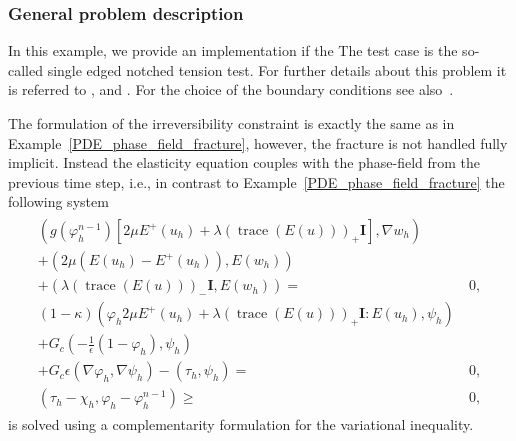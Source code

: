 \subsubsection{General problem description}
In this example, we provide an implementation if the
The test case is the so-called single edged notched 
tension test. For further details about this problem it is referred
to \cite{MieHofWel2010,BoVeScoHuLa12}, and \cite{WeWiWo2014}.
For the choice of the boundary conditions see also~\cite[Section~5]{MangWallothWickWollner:2019}.

The formulation of the irreversibility constraint  is exactly the same
as in Example~\ref{PDE_phase_field_fracture}, however, the fracture is
not handled fully implicit. Instead the elasticity equation
couples with the phase-field from the previous time step, i.e., in
contrast to Example~\ref{PDE_phase_field_fracture} the following
system 
\begin{align*}
 \begin{aligned}
   \left(g(\varphi_h^{n-1})\left[2\mu E^+(u_h) + \lambda (\operatorname{trace}(E(u)))_+ \textbf{I}\right],\nabla w_h \right)\\
  + \left(2\mu \left(E(u_h)-E^+(u_h)\right),E(w_h)\right)\\
 + \left(\lambda (\operatorname{trace}(E(u)))_- \textbf{I},E(w_h)\right) =&\ 0,\\
  (1- \kappa)\left(\varphi_h 2\mu E^+(u_h) + \lambda (\operatorname{trace}(E(u)))_+ \textbf{I} : E(u_h),\psi_h\right)\\
  + G_c \left(-\frac{1}{\epsilon} (1-\varphi_h),\psi_h\right)\\ 
  + G_c \epsilon \left(\nabla \varphi_h,\nabla\psi_h \right) - \left(\tau_h,\psi_h\right) =&\ 0,\\
\left(\tau_h - \chi_h,\varphi_h -\varphi_h^{n-1}\right)\geq&\ 0,
\end{aligned}
\end{align*}
is solved using a complementarity formulation for the variational inequality.







